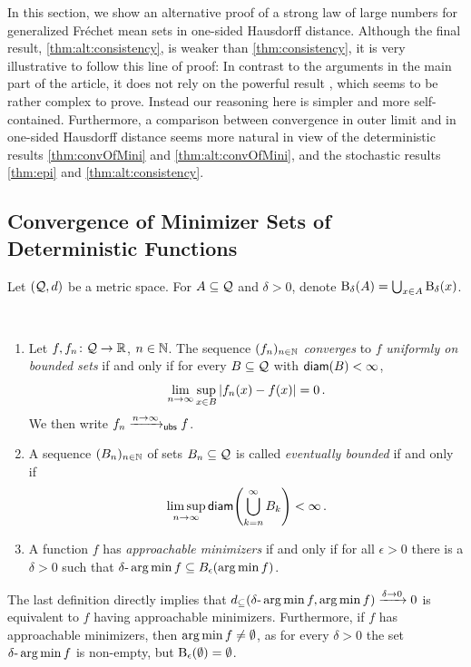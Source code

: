 In this section, we show an alternative proof of a strong law of large numbers for generalized Fréchet mean sets in one-sided Hausdorff distance. Although the final result, \autoref{thm:alt:consistency}, is weaker than \autoref{thm:consistency}, it is very illustrative to follow this line of proof:
In contrast to the arguments in the main part of the article, it does not rely on the powerful result \cite[Theorem 8.2]{korf01}, which seems to be rather complex to prove. Instead our reasoning here is simpler and more self-contained.
Furthermore, a comparison between convergence in outer limit and in one-sided Hausdorff distance seems more natural in view of the deterministic results \autoref{thm:convOfMini} and \autoref{thm:alt:convOfMini}, and the stochastic results \autoref{thm:epi} and \autoref{thm:alt:consistency}.
%
%
\subsection{Convergence of Minimizer Sets of Deterministic Functions}\label{ssec:alt:det}
%
Let $(\mathcal{Q}, d)$ be a metric space. For $A\subseteq \mathcal{Q}$ and $\delta>0$, denote $\operatorname{\mathrm{B}}_\delta(A) = \bigcup_{x\in A} \operatorname{\mathrm{B}}_\delta(x)$. 
%
\begin{definition} \mbox{ }
	\begin{enumerate}[label=(\roman*)]
	\item 
		Let $f,f_n \colon \mathcal{Q}\to\mathbb{R}$, $n\in\mathbb{N}$.
		The sequence $(f_n)_{n\in\mathbb{N}}$  \emph{converges} to $f$ \emph{uniformly on bounded sets} if and only if for every $B\subseteq \mathcal{Q}$ with $\operatorname{\mathsf{diam}}(B)<\infty$,
		\begin{equation*}
		\lim_{n\to\infty} \sup_{x\in B}\left| f_n(x) - f(x) \right| =0
		\, .
		\end{equation*}
		We then write $f_n\xrightarrow{n\to\infty}_{\mathsf{ubs}} f$.
	\item 
		A sequence $(B_n)_{n\in\mathbb{N}}$ of sets $B_n \subseteq \mathcal{Q}$ is called \emph{eventually bounded} if and only if
		\begin{equation*}
		\limsup_{n\to\infty} \operatorname{\mathsf{diam}}\!\left( \bigcup_{k=n}^\infty B_k \right) < \infty
		\, .
		\end{equation*}
	\item 
		A function $f$ has \emph{approachable minimizers} if and only if for all $\epsilon >0$ there is a $\delta>0$ such that
		$\delta\text{-}\operatorname*{arg\,min} f \subseteq B_\epsilon(\operatorname*{arg\,min} f)$.
	\end{enumerate}	
\end{definition}
%
The last definition directly implies that $d_\subseteq(\delta\text{-}\operatorname*{arg\,min} f, \operatorname*{arg\,min} f) \xrightarrow{\delta\to0} 0$ is equivalent to $f$ having approachable minimizers. Furthermore, if $f$ has approachable minimizers, then $\operatorname*{arg\,min} f \neq \emptyset$, as for every $\delta>0$ the set $\delta\text{-}\operatorname*{arg\,min} f$ is non-empty, but $\operatorname{\mathrm{B}}_\epsilon(\emptyset)=\emptyset$.
